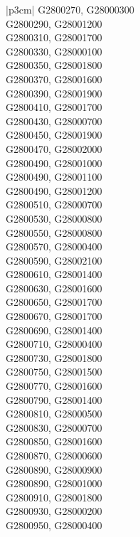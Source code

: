 \begin{customLongTable}{ |p{3cm}| }
G2800270, G28000300 \\ \hline
G2800290, G28001200 \\ \hline
G2800310, G28001700 \\ \hline
G2800330, G28000100 \\ \hline
G2800350, G28001800 \\ \hline
G2800370, G28001600 \\ \hline
G2800390, G28001900 \\ \hline
G2800410, G28001700 \\ \hline
G2800430, G28000700 \\ \hline
G2800450, G28001900 \\ \hline
G2800470, G28002000 \\ \hline
G2800490, G28001000 \\ \hline
G2800490, G28001100 \\ \hline
G2800490, G28001200 \\ \hline
G2800510, G28000700 \\ \hline
G2800530, G28000800 \\ \hline
G2800550, G28000800 \\ \hline
G2800570, G28000400 \\ \hline
G2800590, G28002100 \\ \hline
G2800610, G28001400 \\ \hline
G2800630, G28001600 \\ \hline
G2800650, G28001700 \\ \hline
G2800670, G28001700 \\ \hline
G2800690, G28001400 \\ \hline
G2800710, G28000400 \\ \hline
G2800730, G28001800 \\ \hline
G2800750, G28001500 \\ \hline
G2800770, G28001600 \\ \hline
G2800790, G28001400 \\ \hline
G2800810, G28000500 \\ \hline
G2800830, G28000700 \\ \hline
G2800850, G28001600 \\ \hline
G2800870, G28000600 \\ \hline
G2800890, G28000900 \\ \hline
G2800890, G28001000 \\ \hline
G2800910, G28001800 \\ \hline
G2800930, G28000200 \\ \hline
G2800950, G28000400 \\ \hline

\end{customLongTable}
